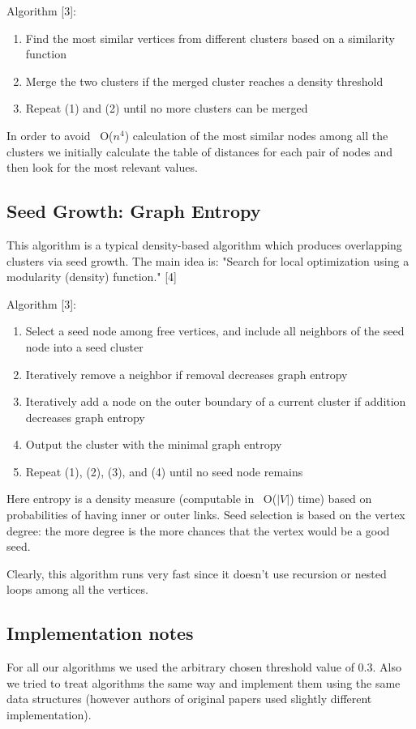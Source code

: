 \documentclass[journal]{IEEEtran}
\begin{document}
Algorithm [3]:
\begin{enumerate}
	\item Find the most similar vertices from different clusters based on a similarity
	function
	\item Merge the two clusters if the merged cluster reaches a density threshold
	\item Repeat (1) and (2) until no more clusters can be merged
\end{enumerate}

In order to avoid ~O($n^4$) calculation of the most similar nodes among all the clusters we initially calculate the table of distances for each pair of nodes and then look for the most relevant values.  

\subsection{Seed Growth: Graph Entropy}
This algorithm is a typical density-based algorithm which produces overlapping clusters via seed growth. The main idea is: "Search for local optimization using a modularity (density) function." [4]

Algorithm [3]:
\begin{enumerate}
	\item Select a seed node among free vertices, and include all neighbors of the seed node into a seed cluster
	\item Iteratively remove a neighbor if removal decreases graph entropy
	\item Iteratively add a node on the outer boundary of a current cluster if addition decreases graph entropy
	\item Output the cluster with the minimal graph entropy
	\item Repeat (1), (2), (3), and (4) until no seed node remains
\end{enumerate}

Here entropy is a density measure (computable in ~O($|V|$) time) based on probabilities of having inner or outer links. Seed selection is based on the vertex degree: the more degree is the more chances that the vertex would be a good seed.

Clearly, this algorithm runs very fast since it doesn't use recursion or nested loops among all the vertices.

\subsection{Implementation notes}
For all our algorithms we used the arbitrary chosen threshold value of 0.3. Also we tried to treat algorithms the same way and implement them using the same data structures (however authors of original papers used slightly different implementation). 
\end{document}
